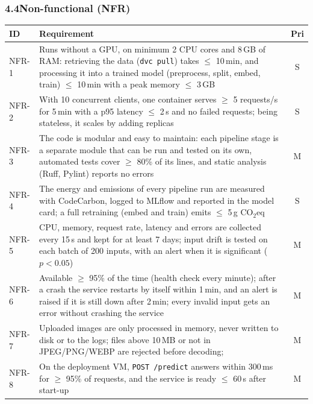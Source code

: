 \documentclass[11pt]{article}
\begin{document}
\smallskip
{}

\subsubsection*{4.4\quad Non-functional (NFR)}
\noindent\begin{tabularx}{\textwidth}{@{}l Y c@{}}
\toprule
\textbf{ID} & \textbf{Requirement} & \textbf{Pri} \\
\midrule
NFR-1 & Runs without a GPU, on minimum 2 CPU cores and 8\,GB of RAM: retrieving the data (\texttt{dvc pull}) takes $\leq$ 10\,min, and processing it into a trained model (preprocess, split, embed, train) $\leq$ 10\,min with a peak memory $\leq$ 3\,GB & S \medskip \\
NFR-2 & With 10 concurrent clients, one container serves $\geq$ 5 requests/s for 5\,min with a p95 latency $\leq$ 2\,s and no failed requests; being stateless, it scales by adding replicas & S \medskip \\
NFR-3 & The code is modular and easy to maintain: each pipeline stage is a separate module that can be run and tested on its own, automated tests cover $\geq$ 80\% of its lines, and static analysis (Ruff, Pylint) reports no errors & M \medskip \\
NFR-4 & The energy and emissions of every pipeline run are measured with CodeCarbon, logged to MLflow and reported in the model card; a full retraining (embed and train) emits $\leq$ 5\,g CO$_2$eq & S \medskip \\
NFR-5 & CPU, memory, request rate, latency and errors are collected every 15\,s and kept for at least 7 days; input drift is tested on each batch of 200 inputs, with an alert when it is significant ($p < 0.05$) & M \medskip \\
NFR-6 & Available $\geq$ 95\% of the time (health check every minute); after a crash the service restarts by itself within 1\,min, and an alert is raised if it is still down after 2\,min; every invalid input gets an error without crashing the service & M \medskip \\
NFR-7 & Uploaded images are only processed in memory, never written to disk or to the logs; files above 10\,MB or not in JPEG/PNG/WEBP are rejected before decoding;  & M \medskip \\
NFR-8 & On the deployment VM, \texttt{POST /predict} answers within 300\,ms for $\geq$ 95\% of requests, and the service is ready $\leq$ 60\,s after start-up & M \medskip \\

\end{tabularx}
\end{document}
